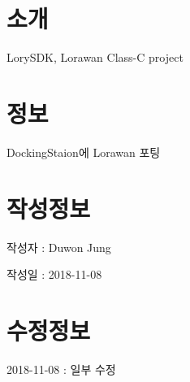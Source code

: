 \hypertarget{index_intro}{}\section{소개}\label{index_intro}

\begin{DoxyItemize}
\item Lory\+S\+DK, Lorawan Class-\/C project
\end{DoxyItemize}\hypertarget{index_info}{}\section{정보}\label{index_info}

\begin{DoxyItemize}
\item Docking\+Staion에 Lorawan 포팅
\end{DoxyItemize}\hypertarget{index_CREATEINFO}{}\section{작성정보}\label{index_CREATEINFO}

\begin{DoxyItemize}
\item 작성자 \+: Duwon Jung
\item 작성일 \+: 2018-\/11-\/08
\end{DoxyItemize}\hypertarget{index_MODIFYINFO}{}\section{수정정보}\label{index_MODIFYINFO}

\begin{DoxyItemize}
\item 2018-\/11-\/08 \+: 일부 수정 
\end{DoxyItemize}